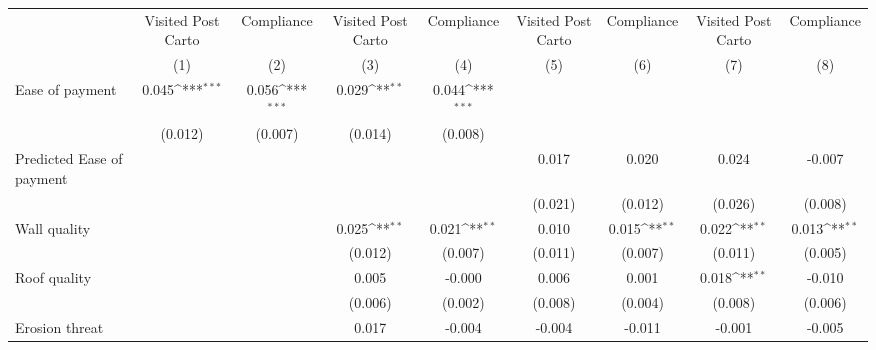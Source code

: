 {
\def\sym#1{\ifmmode^{#1}\else\(^{#1}\)\fi}
\begin{tabular}{l*{8}{c}}
\toprule
                &\multicolumn{1}{c}{Visited Post Carto}&\multicolumn{1}{c}{Compliance}&\multicolumn{1}{c}{Visited Post Carto}&\multicolumn{1}{c}{Compliance}&\multicolumn{1}{c}{Visited Post Carto}&\multicolumn{1}{c}{Compliance}&\multicolumn{1}{c}{Visited Post Carto}&\multicolumn{1}{c}{Compliance}\\
                &\multicolumn{1}{c}{(1)}         &\multicolumn{1}{c}{(2)}         &\multicolumn{1}{c}{(3)}         &\multicolumn{1}{c}{(4)}         &\multicolumn{1}{c}{(5)}         &\multicolumn{1}{c}{(6)}         &\multicolumn{1}{c}{(7)}         &\multicolumn{1}{c}{(8)}         \\
\midrule
Ease of payment &    0.045\sym{***}&    0.056\sym{***}&    0.029\sym{**} &    0.044\sym{***}&                  &                  &                  &                  \\
                &  (0.012)         &  (0.007)         &  (0.014)         &  (0.008)         &                  &                  &                  &                  \\
Predicted Ease of payment&                  &                  &                  &                  &    0.017         &    0.020         &    0.024         &   -0.007         \\
                &                  &                  &                  &                  &  (0.021)         &  (0.012)         &  (0.026)         &  (0.008)         \\
Wall quality    &                  &                  &    0.025\sym{**} &    0.021\sym{**} &    0.010         &    0.015\sym{**} &    0.022\sym{**} &    0.013\sym{**} \\
                &                  &                  &  (0.012)         &  (0.007)         &  (0.011)         &  (0.007)         &  (0.011)         &  (0.005)         \\
Roof quality    &                  &                  &    0.005         &   -0.000         &    0.006         &    0.001         &    0.018\sym{**} &   -0.010         \\
                &                  &                  &  (0.006)         &  (0.002)         &  (0.008)         &  (0.004)         &  (0.008)         &  (0.006)         \\
Erosion threat  &                  &                  &    0.017         &   -0.004         &   -0.004         &   -0.011         &   -0.001         &   -0.005         \\

\end{tabular}}
